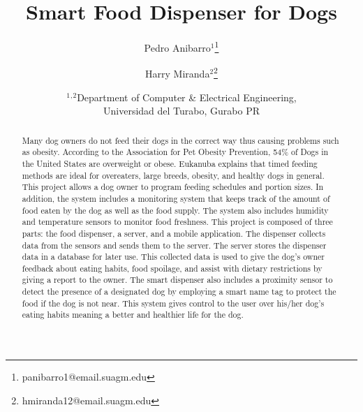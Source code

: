 \documentclass[12pt]{article}
\begin{document}
%
\title{Smart Food Dispenser for Dogs}

\author{Pedro Anibarro$^1$\thanks{panibarro1@email.suagm.edu}
\and
Harry Miranda$^2$\thanks{hmiranda12@email.suagm.edu}
\footnotemark[1]}

\date{
    $^1$$^,$$^2$Department of Computer \& Electrical Engineering,\\
    Universidad del Turabo, Gurabo PR
}


\maketitle


\begin{abstract}

Many dog owners do not feed their dogs in the correct way thus causing problems such as obesity. According to the Association for Pet Obesity Prevention, 54\% of Dogs in the United States are overweight or obese\cite{APOP2016}. Eukanuba explains that timed feeding methods are ideal for overeaters, large breeds, obesity, and healthy dogs in general. This project allows a dog owner to program feeding schedules and portion sizes\cite{Eukanuba2016}. In addition, the system includes a monitoring system that keeps track of the amount of food eaten by the dog as well as the food supply. The system also includes humidity and temperature sensors to monitor food freshness. This project is composed of three parts: the food dispenser, a server, and a mobile application. The dispenser collects data from the sensors and sends them to the server. The server stores the dispenser data in a database for later use. This collected data is used to give the dog's owner feedback about eating habits, food spoilage, and assist with dietary restrictions by giving a report to the owner. The smart dispenser also includes a proximity sensor to detect the presence of a designated dog by employing a smart name tag to protect the food if the dog is not near. This system gives control to the user over his/her dog’s eating habits meaning a better and healthier life for the dog.

\end{abstract}

\end{document}
